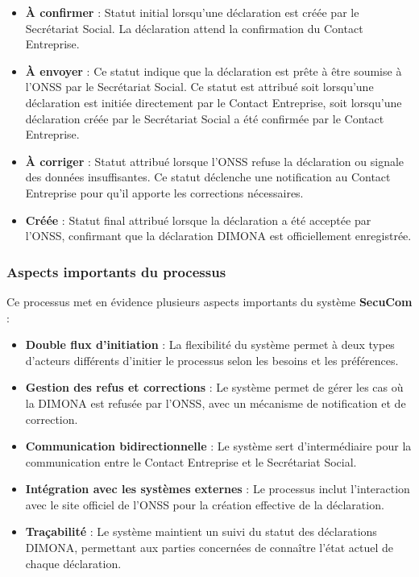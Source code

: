 \begin{itemize}[leftmargin=*,label=\textcolor{darkgray}{$\bullet$},itemsep=0.3em]
  \item \textbf{À confirmer} : Statut initial lorsqu'une déclaration est créée par le Secrétariat Social. La déclaration attend la confirmation du Contact Entreprise.
  
  \item \textbf{À envoyer} : Ce statut indique que la déclaration est prête à être soumise à l'ONSS par le Secrétariat Social. Ce statut est attribué soit lorsqu'une déclaration est initiée directement par le Contact Entreprise, soit lorsqu'une déclaration créée par le Secrétariat Social a été confirmée par le Contact Entreprise.
  
  \item \textbf{À corriger} : Statut attribué lorsque l'ONSS refuse la déclaration ou signale des données insuffisantes. Ce statut déclenche une notification au Contact Entreprise pour qu'il apporte les corrections nécessaires.
  
  \item \textbf{Créée} : Statut final attribué lorsque la déclaration a été acceptée par l'ONSS, confirmant que la déclaration DIMONA est officiellement enregistrée.
\end{itemize}
\newpage

\subsubsection{Aspects importants du processus}

\noindent Ce processus met en évidence plusieurs aspects importants du système \textbf{SecuCom} :

\begin{itemize}[leftmargin=*,label=\textcolor{darkgray}{$\bullet$},itemsep=0.3em]
  \item \textbf{Double flux d'initiation} : La flexibilité du système permet à deux types d'acteurs différents d'initier le processus selon les besoins et les préférences.
  \item \textbf{Gestion des refus et corrections} : Le système permet de gérer les cas où la DIMONA est refusée par l'ONSS, avec un mécanisme de notification et de correction.
  \item \textbf{Communication bidirectionnelle} : Le système sert d'intermédiaire pour la communication entre le Contact Entreprise et le Secrétariat Social.
  \item \textbf{Intégration avec les systèmes externes} : Le processus inclut l'interaction avec le site officiel de l'ONSS pour la création effective de la déclaration.
  \item \textbf{Traçabilité} : Le système maintient un suivi du statut des déclarations DIMONA, permettant aux parties concernées de connaître l'état actuel de chaque déclaration.
\end{itemize}

